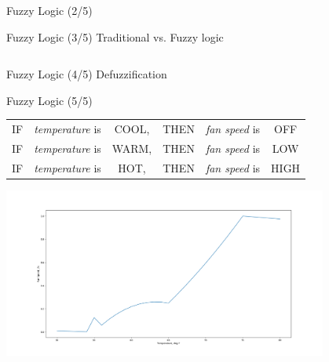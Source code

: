\documentclass[]{beamer}
\begin{document}
\begin{frame}{Fuzzy Logic (2/5)}

\end{frame}

\begin{frame}{Fuzzy Logic (3/5)}
    \centering
    Traditional vs. Fuzzy logic
    \begin{columns}
        \begin{column}{0.5\textwidth}
            \scalebox{0.45}{}
        \end{column}
        \begin{column}{0.5\textwidth}
            \scalebox{0.45}{}
        \end{column}
    \end{columns}
\end{frame}

\begin{frame}{Fuzzy Logic (4/5)}
    \centering
    Defuzzification\\
    \scalebox{0.6}{}
\end{frame}

\begin{frame}{Fuzzy Logic (5/5)}
    \vspace{2em}
    \begin{tabular}{cccccc}
        IF &  \emph{temperature} is & COOL, & THEN & \emph{fan speed} is & OFF\\
        IF &  \emph{temperature} is & WARM, & THEN & \emph{fan speed} is & LOW\\
        IF &  \emph{temperature} is & HOT,  & THEN & \emph{fan speed} is & HIGH
    \end{tabular}\vspace{1em}
    \centering
    \includegraphics[width=0.8\textwidth]{../images/fuzzyfan}
\end{frame}
\end{document}
